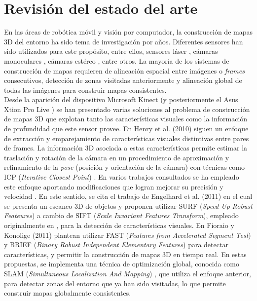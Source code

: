 \chapter{Revisión del estado del arte}
\label{cap:estado-del-arte}

En las áreas de robótica móvil y visión por computador, la construcción de mapas 3D del entorno ha sido tema de investigación por años. Diferentes sensores han sido utilizados para este propósito, entre ellos, sensores láser \cite{chou2013robotic,Montemerlo02fastslam}, cámaras monoculares \cite{tomono2009robust,clemente_etal_rss2007}, cámaras estéreo \cite{Mei11,Konolige08}, entre otros. La mayoría de los sistemas de construcción de mapas requieren de alineación espacial entre imágenes o \textit{frames} consecutivos, detección de zonas visitadas anteriormente y alineación global de todas las imágenes para construir mapas consistentes. \\
Desde la aparición del dispositivo Microsoft Kinect (y posteriormente el Asus Xtion Pro Live \cite{asus-xtion-pro-live}) se han presentado varias soluciones al problema de construcción de mapas 3D que explotan tanto las características visuales como la información de profundidad que este sensor provee. En Henry et al. (2010) \cite{henry2010rgb} siguen un enfoque de extracción y emparejamiento de características visuales distintivas entre pares de frames. La información 3D asociada a estas características permite estimar la traslación y rotación de la cámara en un procedimiento de aproximación y refinamiento de la \textit{pose} (posición y orientación de la cámara) con técnicas como ICP (\textit{Iterative Closest Point}) \cite{Besl92}. En varios trabajos consultados se ha empleado este enfoque aportando modificaciones que logran mejorar su precisión y velocidad \cite{engelhard2011real,hogmanbuilding,fioraio2011realtime,6614623}. En este sentido, se cita el trabajo de Engelhard et al. (2011) \cite{engelhard2011real} en el cual se presenta un escaneo 3D de objetos y proponen utilizar SURF (\textit{Speed Up Robust Feateures}) \cite{bay2008speeded} a cambio de SIFT (\textit{Scale Invariant Features Transform}), empleado originalmente en \cite{henry2010rgb}, para la detección de características visuales. En Fioraio y Konolige (2011) \cite{fioraio2011realtime} plantean utilizar FAST (\textit{Features from Accelerated Segment Test})\cite{Rosten06machinelearning} y BRIEF (\textit{Binary Robust Independent Elementary Features}) \cite{Calonder12} para detectar características, y permitir la construcción de mapas 3D en tiempo real. En estas propuestas, se implementa una técnica de optimización global, conocida como SLAM (\textit{Simultaneous Localization And Mapping}) \cite{wiki-slam}, que utiliza el enfoque anterior, para detectar zonas del entorno que ya han sido visitadas, lo que permite construir mapas globalmente consistentes. \\
